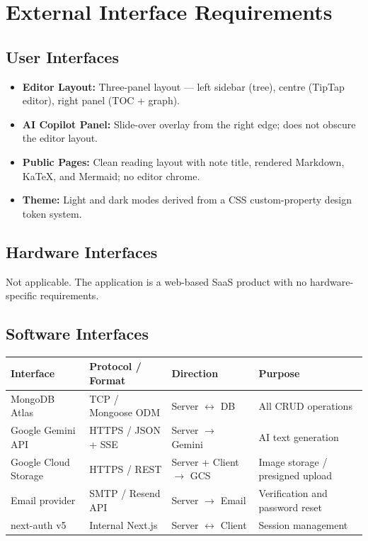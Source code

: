 \documentclass[12pt, a4paper]{article}
\begin{document}
\section{External Interface Requirements}
\label{sec:interfaces}

\subsection{User Interfaces}

\begin{itemize}[leftmargin=2em]
  \item \textbf{Editor Layout:} Three-panel layout — left sidebar (tree),
        centre (TipTap editor), right panel (TOC + graph).
  \item \textbf{AI Copilot Panel:} Slide-over overlay from the right edge;
        does not obscure the editor layout.
  \item \textbf{Public Pages:} Clean reading layout with note title, rendered
        Markdown, KaTeX, and Mermaid; no editor chrome.
  \item \textbf{Theme:} Light and dark modes derived from a CSS
        custom-property design token system.
\end{itemize}

\subsection{Hardware Interfaces}

Not applicable. The application is a web-based SaaS product with no
hardware-specific requirements.

\subsection{Software Interfaces}

\begin{longtable}{@{}L{3.5cm} L{3cm} L{2.5cm} L{4.5cm}@{}}
  \toprule
  \textbf{Interface} & \textbf{Protocol / Format} & \textbf{Direction}
    & \textbf{Purpose} \\
  \midrule\endhead
  \bottomrule\endfoot
  MongoDB Atlas        & TCP / Mongoose ODM  & Server $\leftrightarrow$ DB
    & All CRUD operations \\
  Google Gemini API    & HTTPS / JSON + SSE  & Server $\rightarrow$ Gemini
    & AI text generation \\
  Google Cloud Storage & HTTPS / REST        & Server + Client $\rightarrow$ GCS
    & Image storage / presigned upload \\
  Email provider       & SMTP / Resend API   & Server $\rightarrow$ Email
    & Verification and password reset \\
  next-auth v5         & Internal Next.js    & Server $\leftrightarrow$ Client
    & Session management \\
\end{longtable}
\end{document}
